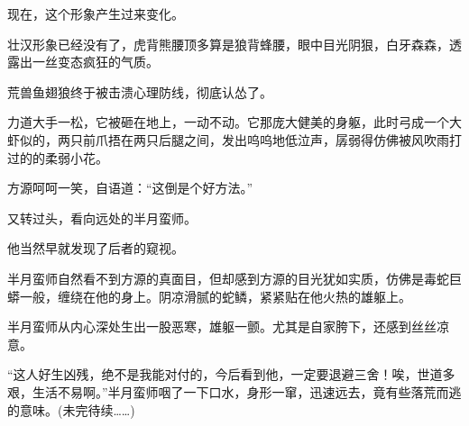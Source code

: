 \begin{this_body}
现在，这个形象产生过来变化。

壮汉形象已经没有了，虎背熊腰顶多算是狼背蜂腰，眼中目光阴狠，白牙森森，透露出一丝变态疯狂的气质。

荒兽鱼翅狼终于被击溃心理防线，彻底认怂了。

力道大手一松，它被砸在地上，一动不动。它那庞大健美的身躯，此时弓成一个大虾似的，两只前爪捂在两只后腿之间，发出呜呜地低泣声，孱弱得仿佛被风吹雨打过的的柔弱小花。

方源呵呵一笑，自语道：“这倒是个好方法。”

又转过头，看向远处的半月蛮师。

他当然早就发现了后者的窥视。

半月蛮师自然看不到方源的真面目，但却感到方源的目光犹如实质，仿佛是毒蛇巨蟒一般，缠绕在他的身上。阴凉滑腻的蛇鳞，紧紧贴在他火热的雄躯上。

半月蛮师从内心深处生出一股恶寒，雄躯一颤。尤其是自家胯下，还感到丝丝凉意。

“这人好生凶残，绝不是我能对付的，今后看到他，一定要退避三舍！唉，世道多艰，生活不易啊。”半月蛮师咽了一下口水，身形一窜，迅速远去，竟有些落荒而逃的意味。(未完待续……)

\end{this_body}

